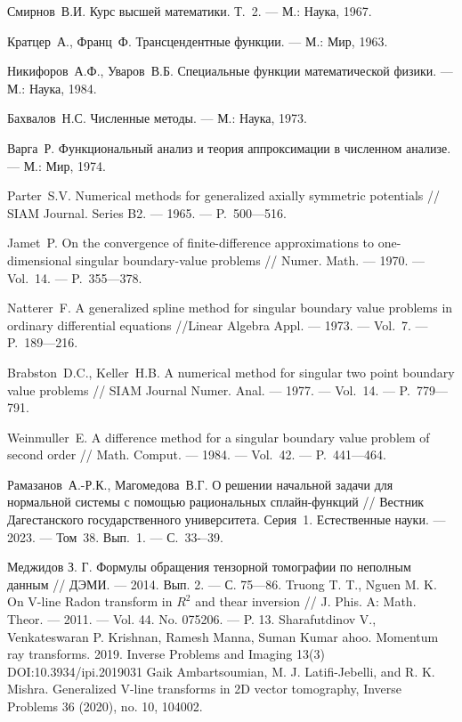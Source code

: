\begin{thebibliography}{111}
 Смирнов~В.И. Курс высшей математики. Т.~2.
--- М.: Наука, 1967. 

 Кратцер~А., Франц~Ф. Трансцендентные функции.
 --- М.: Мир, 1963.

 Никифоров~А.Ф., Уваров~В.Б. Специальные функции математической физики.
 --- М.: Наука, 1984.

  Бахвалов~Н.С. Численные методы.
--- М.: Наука, 1973. 

  Варга~Р. Функциональный анализ и теория аппроксимации
в численном анализе. --- М.: Мир, 1974. 

 Parter~S.V. Numerical methods for generalized axially symmetric potentials
 // SIAM Journal. Series B2.  --- 1965.  --- P.~500---516.

  Jamet~P. On the convergence of finite-difference 
approximations to one-dimensional singular boundary-value problems
 // Numer. Math.  --- 1970. --- Vol.~14. --- P.~355---378.

  Natterer~F. A generalized spline method for singular boundary value problems in ordinary differential equations
 //Linear Algebra Appl. --- 1973. --- Vol.~7. --- P.~189---216.

 Brabston~D.C., Keller~H.B. A numerical method for singular
 two point  boundary value problems
 // SIAM Journal Numer. Anal. --- 1977. --- Vol.~14. --- P.~779---791.

  Weinmuller~E. A difference  method for a singular
 boundary value problem of second order
 // Math. Comput. --- 1984. --- Vol.~42. --- P.~441---464. 
 
 Рамазанов~А.-Р.К., Магомедова~В.Г. О решении начальной задачи для 
нормальной системы с помощью рациональных сплайн-функций // Вестник Дагестанского 
государственного университета. Серия~1. Естественные науки. --- 2023. --- Том~38. Вып.~1. 
--- С.~33-–39. 


  Меджидов З. Г. Формулы обращения тензорной томографии по неполным данным // ДЭМИ. --- 2014. Вып. 2. --- С. 75---86.
 Truong T. T., Nguen M. K. On V-line Radon transform in $R^2$   and thear inversion // J. Phis. A: Math. Theor. --- 2011. --- Vol. 44. No. 075206. --- P. 13.
 Sharafutdinov V., Venkateswaran P. Krishnan, Ramesh Manna, Suman Kumar ahoo. Momentum ray transforms. 2019. Inverse Problems and Imaging 13(3) DOI:10.3934/ipi.2019031
 Gaik Ambartsoumian, M. J. Latifi-Jebelli, and R. K. Mishra. Generalized V-line transforms in 2D vector tomography, Inverse Problems 36 (2020), no. 10, 104002.
  

\end{thebibliography}

